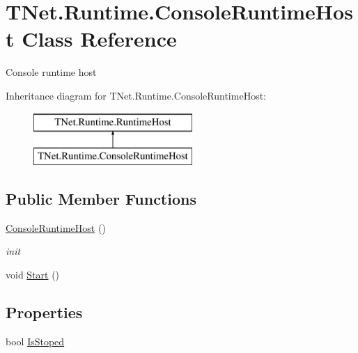 \hypertarget{class_t_net_1_1_runtime_1_1_console_runtime_host}{}\section{T\+Net.\+Runtime.\+Console\+Runtime\+Host Class Reference}
\label{class_t_net_1_1_runtime_1_1_console_runtime_host}


Console runtime host  


Inheritance diagram for T\+Net.\+Runtime.\+Console\+Runtime\+Host\+:\begin{figure}[H]
\begin{center}
\leavevmode
\includegraphics[height=2.000000cm]{class_t_net_1_1_runtime_1_1_console_runtime_host}
\end{center}
\end{figure}
\subsection*{Public Member Functions}
\begin{DoxyCompactItemize}
\item 
\mbox{\hyperlink{class_t_net_1_1_runtime_1_1_console_runtime_host_aad035e8b7e0962d1e6f3675110e81c29}{Console\+Runtime\+Host}} ()
\begin{DoxyCompactList}\small\item\em init \end{DoxyCompactList}\item 
void \mbox{\hyperlink{class_t_net_1_1_runtime_1_1_console_runtime_host_adf2f6c75dce5f7b3bf26a5a2394ecccc}{Start}} ()
\end{DoxyCompactItemize}
\subsection*{Properties}
\begin{DoxyCompactItemize}
\item 
bool \mbox{\hyperlink{class_t_net_1_1_runtime_1_1_console_runtime_host_a10e9736669439e4c4d0d7b4f04c6ac0c}{Is\+Stoped}}
\end{DoxyCompactItemize}
